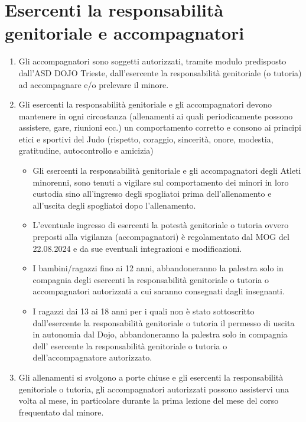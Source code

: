 \documentclass{djtsasddoc}
\begin{document}
	\section{Esercenti la responsabilità genitoriale e accompagnatori}
	\begin{enumerate}
		\item Gli accompagnatori sono soggetti autorizzati, tramite modulo predisposto dall'ASD DOJO Trieste, dall'esercente la responsabilità genitoriale (o tutoria) ad accompagnare e/o prelevare il minore.
		\item Gli esercenti la responsabilità genitoriale e gli accompagnatori devono mantenere in ogni circostanza (allenamenti ai quali periodicamente possono assistere, gare, riunioni ecc.) un comportamento corretto e consono ai principi etici e sportivi del Judo (rispetto, coraggio, sincerità, onore, modestia, gratitudine, autocontrollo e amicizia)
		\begin{itemize}
			\item Gli esercenti la responsabilità genitoriale e gli accompagnatori degli Atleti minorenni, sono tenuti a vigilare sul comportamento dei minori in loro custodia sino all'ingresso degli spogliatoi prima dell'allenamento e all'uscita degli spogliatoi dopo l'allenamento.
			\item L'eventuale ingresso di esercenti la potestà genitoriale o tutoria ovvero preposti alla vigilanza (accompagnatori) è regolamentato dal MOG del 22.08.2024 e da sue eventuali integrazioni e modificazioni.
			\item I bambini/ragazzi fino ai 12 anni, abbandoneranno la palestra solo in compagnia degli esercenti la responsabilità genitoriale o tutoria o accompagnatori autorizzati a cui saranno consegnati dagli insegnanti.
			\item I ragazzi dai 13 ai 18 anni per i quali non è stato sottoscritto dall'esercente la responsabilità genitoriale  o tutoria il permesso di uscita in autonomia dal Dojo, abbandoneranno la palestra solo in compagnia dell' esercente la responsabilità genitoriale o tutoria o dell'accompagnatore autorizzato.
		\end{itemize}
		\item Gli allenamenti si svolgono a porte chiuse e gli esercenti la responsabilità genitoriale o tutoria, gli accompagnatori autorizzati possono assistervi una volta al mese, in particolare durante la prima lezione del mese del corso frequentato dal minore.
	\end{enumerate}
	
\end{document}
